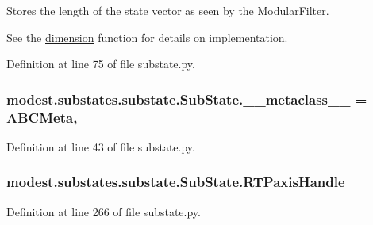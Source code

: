 Stores the length of the state vector as seen by the Modular\+Filter. 

See the \hyperlink{classmodest_1_1substates_1_1substate_1_1SubState_ab9027f6d1d7d57c47731612f519b7ee6}{dimension} function for details on implementation. 

Definition at line 75 of file substate.\+py.

\subsubsection[{\texorpdfstring{\+\_\+\+\_\+metaclass\+\_\+\+\_\+}{__metaclass__}}]{\setlength{\rightskip}{0pt plus 5cm}modest.\+substates.\+substate.\+Sub\+State.\+\_\+\+\_\+metaclass\+\_\+\+\_\+ = A\+B\+C\+Meta\hspace{0.3cm}{\ttfamily [static]}, {\ttfamily [private]}}\hypertarget{classmodest_1_1substates_1_1substate_1_1SubState_a31b0d49b08a8cd07b6d6e4b646d2a307}{}\label{classmodest_1_1substates_1_1substate_1_1SubState_a31b0d49b08a8cd07b6d6e4b646d2a307}


Definition at line 43 of file substate.\+py.

\subsubsection[{\texorpdfstring{R\+T\+Paxis\+Handle}{RTPaxisHandle}}]{\setlength{\rightskip}{0pt plus 5cm}modest.\+substates.\+substate.\+Sub\+State.\+R\+T\+Paxis\+Handle}\hypertarget{classmodest_1_1substates_1_1substate_1_1SubState_a497ccbb6658589b02568e87c6382222e}{}\label{classmodest_1_1substates_1_1substate_1_1SubState_a497ccbb6658589b02568e87c6382222e}


Definition at line 266 of file substate.\+py.

